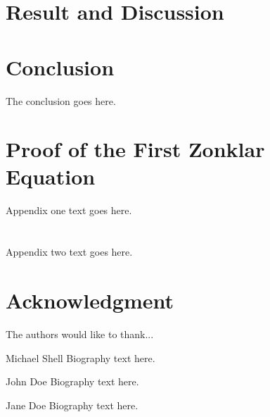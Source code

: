 \documentclass[journal]{IEEEtran}
\begin{document}
\section{Result and Discussion}


\section{Conclusion}
The conclusion goes here.




\appendices
\section{Proof of the First Zonklar Equation}
Appendix one text goes here.


\section{}
Appendix two text goes here.


\section*{Acknowledgment}


The authors would like to thank...

\ifCLASSOPTIONcaptionsoff
  \newpage
\fi





\begin{IEEEbiography}{Michael Shell}
Biography text here.
\end{IEEEbiography}

\begin{IEEEbiographynophoto}{John Doe}
Biography text here.
\end{IEEEbiographynophoto}


\begin{IEEEbiographynophoto}{Jane Doe}
Biography text here.
\end{IEEEbiographynophoto}
\end{document}
